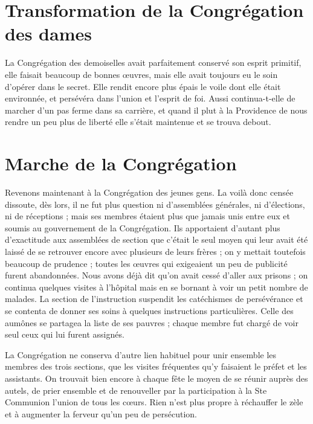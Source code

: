 \section*{Transformation de la Congrégation des dames}
La Congrégation des demoiselles avait parfaitement conservé son esprit primitif, elle faisait beaucoup de bonnes œuvres, mais elle avait toujours eu le soin d'opérer dans le secret. Elle rendit encore plus épais le voile dont elle était environnée, et persévéra dans l'union et l'esprit de foi. Aussi continua-t-elle de marcher d'un pas ferme dans sa carrière, et quand il plut à la Providence de nous rendre un peu plus de liberté elle s'était maintenue et se trouva debout.

\section*{Marche de la Congrégation}
Revenons maintenant à la Congrégation des jeunes gens. La voilà donc censée dissoute, dès lors, il ne fut plus question ni d'assemblées générales, ni d'élections, ni de réceptions ; mais ses membres étaient plus que jamais unis entre eux et soumis au gouvernement de la Congrégation. Ils apportaient d'autant plus d'exactitude aux assemblées de section que c'était le seul moyen qui leur avait été laissé de se retrouver encore avec plusieurs de leurs frères ; on y mettait toutefois beaucoup de prudence ; toutes les œuvres qui exigeaient un peu de publicité furent abandonnées. Nous avons déjà dit qu'on avait cessé d'aller aux prisons ; on continua quelques visites à l'hôpital mais en se bornant à voir un petit nombre de malades. La section de l'instruction suspendit les catéchismes de persévérance et se contenta de donner ses soins à quelques instructions particulières. Celle des aumônes se partagea la liste de ses pauvres ; chaque membre fut chargé de voir seul ceux qui lui furent assignés.

La Congrégation ne conserva d'autre lien habituel pour unir ensemble les membres des trois sections, que les visites fréquentes qu'y faisaient le préfet et les assistants. On trouvait bien encore à chaque fête le moyen de se réunir auprès des autels, de prier ensemble et de renouveller par la participation à la Ste Communion l'union de tous les cœurs. Rien n'est plus propre à réchauffer le zèle et à augmenter la ferveur qu'un peu de persécution.

